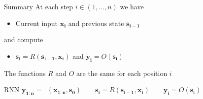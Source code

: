 \documentclass[12pt,aspectratio=169,handout]{beamer}
\DeclareMathOperator*{\rnnstar}{RNN^{*}}
\begin{document}
\begin{frame}{Summary}
At each step $i \in (1, \ldots, n)$ we have
\begin{itemize}
	\item Current input $\bm{x_i}$ and previous state $\bm{s_{i - 1}}$
\end{itemize}
and compute
\begin{itemize}
	\item $\bm{s_i} = R(\bm{s_{i-1}}, \bm{x_i})$ and $\bm{y_i}  = O(\bm{s_i})$
\end{itemize}

The functions $R$ and $O$ are the same for each position $i$

\begin{block}{RNN}
	$\bm{y_{1:n}} = \rnnstar (\bm{x_{1:n}}, \bm{s_0})
	\qquad
	\bm{s_i} = R(\bm{s_{i-1}}, \bm{x_i})
	\qquad
	\bm{y_i}  = O(\bm{s_i})$
\end{block}


\end{frame}
\end{document}
